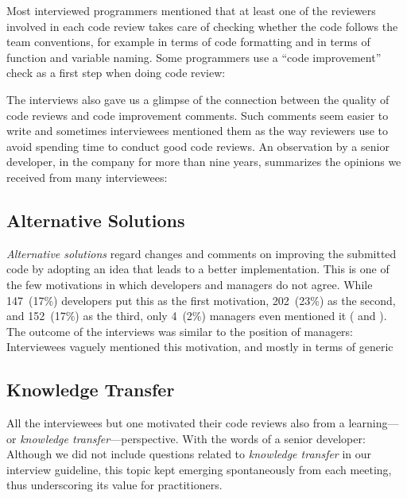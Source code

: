 Most interviewed programmers mentioned that at least one of the reviewers
involved in each code review takes care of checking whether the code follows
the team conventions, for example in terms of code formatting and in terms of
function and variable naming. Some programmers use a ``code improvement''
check as a first step when doing code review: 

The interviews also gave us a glimpse of the connection between the quality of
code reviews and code improvement comments. Such comments seem easier to
write and sometimes interviewees mentioned them as the way reviewers use to
avoid spending time to conduct good code reviews. An observation by a senior
developer, in the company for more than nine years, summarizes the opinions we
received from many interviewees: 

\subsection{Alternative Solutions}

\emph{Alternative solutions} regard changes and comments on improving the
submitted code by adopting an idea that leads to a better implementation. This
is one of the few motivations in which developers and managers do not agree.
While 147~(17\%) developers put this as the first motivation, 202~(23\%) as the
second, and 152~(17\%) as the third, only 4~(2\%) managers even mentioned it
(\eg {} and
). The outcome of the interviews was similar to the
position of managers: Interviewees vaguely mentioned this motivation, and
mostly in terms of generic 


\subsection{Knowledge Transfer}

All the interviewees but one motivated their code reviews also from a learning---or \emph{knowledge transfer}---perspective. With the words of a senior developer:
 Although we did not
include questions related to \emph{knowledge transfer} in our interview guideline,
this topic kept emerging spontaneously from each meeting, thus underscoring its
value for practitioners.

